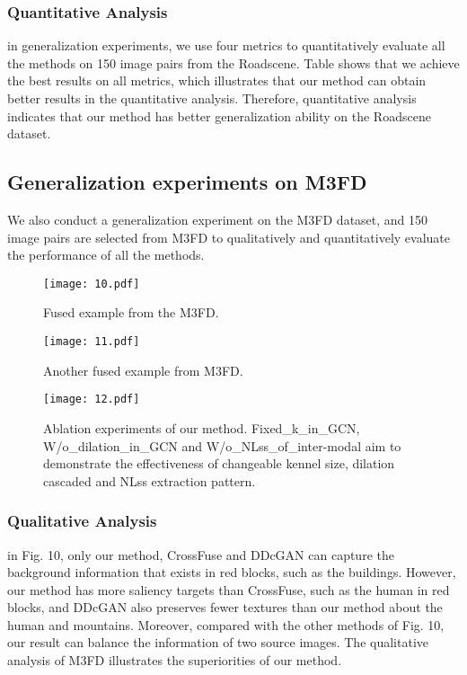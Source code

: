 \documentclass[journal]{IEEEtran}
\begin{document}
\subsubsection{ Quantitative Analysis}
in generalization experiments, we use four metrics to quantitatively evaluate all the methods on 150 image pairs from the Roadscene. Table \uppercase\expandafter{} shows that we achieve the best results on all metrics, which illustrates that our method can obtain better results in the quantitative analysis. Therefore, quantitative analysis indicates that our method has better generalization ability on the Roadscene dataset.

\subsection{Generalization experiments on M3FD}
We also conduct a generalization experiment on the M3FD dataset, and 150 image pairs are selected from M3FD to qualitatively and quantitatively evaluate the performance of all the methods.

\begin{figure}[!t]
\centering
\texttt{[image: 10.pdf]}
\caption{Fused example from the M3FD.}
\label{FIG:10}
\end{figure}

\begin{figure}[!t]
\centering
\texttt{[image: 11.pdf]}
\caption{Another fused example from M3FD.}
\label{FIG:11}
\end{figure}

\begin{figure}[!t]
\centering
\texttt{[image: 12.pdf]}
\caption{Ablation experiments of our method. Fixed\_k\_in\_GCN, W/o\_dilation\_in\_GCN and W/o\_NLss\_of\_inter-modal aim to demonstrate the effectiveness of changeable kennel size, dilation cascaded and NLss extraction pattern.}
\label{FIG:12}
\end{figure}

\subsubsection{Qualitative Analysis}
in Fig. 10, only our method, CrossFuse and DDcGAN can capture the background information that exists in red blocks, such as the buildings. However, our method has more saliency targets than CrossFuse, such as the human in red blocks, and DDcGAN also preserves fewer textures than our method about the human and mountains. Moreover, compared with the other methods of Fig. 10, our result can balance the information of two source images. The qualitative analysis of M3FD illustrates the superiorities of our method.
\end{document}
